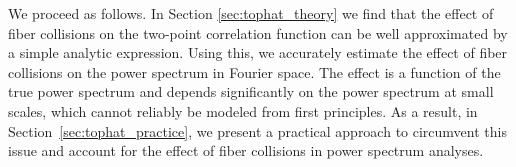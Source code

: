                                                                                                                                                                                                                                                                           We proceed as follows. In Section \ref{sec:tophat_theory} we find that the effect of fiber collisions 
                                                                                                                                                                                                                                                                          on the two-point correlation function can be well approximated by a simple 
                                                                                                                                                                                                                                                                          analytic expression. Using this, we accurately estimate the 
                                                                                                                                                                                                                                                                          effect of fiber collisions on the power spectrum in Fourier space. The effect 
                                                                                                                                                                                                                                                                          is a function of the true power spectrum and depends significantly on the 
                                                                                                                                                                                                                                                                          power spectrum at small scales, which cannot reliably be modeled from first principles. As a result, in Section~\ref{sec:tophat_practice}, we 
                                                                                                                                                                                                                                                                          present a practical approach to circumvent this issue and account for the effect of fiber collisions in 
                                                                                                                                                                                                                                                                          power spectrum analyses. 

